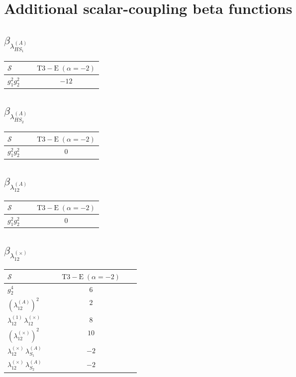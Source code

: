 \documentclass[9pt]{article}
\begin{document}
\section*{Additional scalar-coupling beta functions}
\subsection*{$ \beta_{\lambda_{HS_1}^{(A)}} $}
\begin{longtable}{@{}p{0.31\linewidth}c@{}}
\toprule
$\mathcal{S}$ & $ \mathrm{T3-E}\;(\alpha=-2) $ \\
\midrule
$ g_1^2g_2^2 $ & $ -12 $ \\
\bottomrule
\end{longtable}
\subsection*{$ \beta_{\lambda_{HS_2}^{(A)}} $}
\begin{longtable}{@{}p{0.31\linewidth}c@{}}
\toprule
$\mathcal{S}$ & $ \mathrm{T3-E}\;(\alpha=-2) $ \\
\midrule
$ g_1^2g_2^2 $ & $ 0 $ \\
\bottomrule
\end{longtable}
\subsection*{$ \beta_{\lambda_{12}^{(A)}} $}
\begin{longtable}{@{}p{0.31\linewidth}c@{}}
\toprule
$\mathcal{S}$ & $ \mathrm{T3-E}\;(\alpha=-2) $ \\
\midrule
$ g_1^2g_2^2 $ & $ 0 $ \\
\bottomrule
\end{longtable}
\subsection*{$ \beta_{\lambda_{12}^{(\times)}} $}
\begin{longtable}{@{}p{0.31\linewidth}c@{}}
\toprule
$\mathcal{S}$ & $ \mathrm{T3-E}\;(\alpha=-2) $ \\
\midrule
$ g_2^4 $ & $ 6 $ \\
$ \left(\lambda_{12}^{(A)}\right)^2 $ & $ 2 $ \\
$ \lambda_{12}^{(1)}\,\lambda_{12}^{(\times)} $ & $ 8 $ \\
$ \left(\lambda_{12}^{(\times)}\right)^2 $ & $ 10 $ \\
$ \lambda_{12}^{(\times)}\,\lambda_{S_1}^{(A)} $ & $ -2 $ \\
$ \lambda_{12}^{(\times)}\,\lambda_{S_2}^{(A)} $ & $ -2 $ \\
\bottomrule
\end{longtable}
\end{document}
